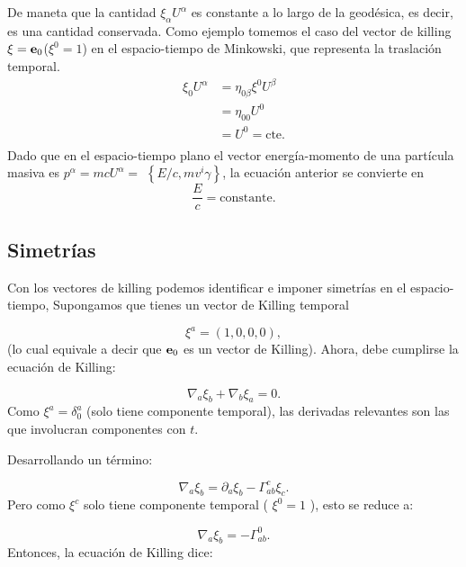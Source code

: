 De maneta que la cantidad $\xi_\alpha U^\alpha$ es constante a lo largo de la geodésica, es decir, es una cantidad conservada.
Como ejemplo tomemos el caso del vector de killing $\mathbf{\xi} = \mathbf{e}_0$($\xi^0 =1$) en el espacio-tiempo de Minkowski, que representa la traslación temporal. 
\begin{equation}
    \begin{aligned}
        \xi_0 U^\alpha & = \eta_{0 \beta} \xi^0 U^\beta \\
        & = \eta_{0 0 } U^0 \\
        & = U^0 = \text{cte.} \\
    \end{aligned}
\end{equation} 
Dado que en el espacio-tiempo plano el vector energía-momento de una partícula masiva es $p^\alpha=m c U^\alpha=$ $\left\{E / c, m v^i \gamma\right\}$, la ecuación anterior se convierte en
\[
    \frac{E}{c}=\text{constante}.
\]


\subsection{Simetrías }
\label{subsec:simetria}
Con los  vectores de killing podemos identificar e imponer simetrías en el espacio-tiempo,
Supongamos que tienes un vector de Killing temporal

\begin{equation}
    \xi^a=(1,0,0,0),   
\end{equation}
(lo cual equivale a decir que $\mathbf{e}_0$ es un vector de Killing).
Ahora, debe cumplirse la ecuación de Killing:

\begin{equation}
    \nabla_a \xi_b+\nabla_b \xi_a=0.
\end{equation}
Como $\xi^a=\delta_0^a$ (solo tiene componente temporal), las derivadas relevantes son las que involucran componentes con $t$.

Desarrollando un término:

\begin{equation}
    \nabla_a \xi_b=\partial_a \xi_b-\Gamma_{a b}^c \xi_c.
\end{equation}
Pero como $\xi^c$ solo tiene componente temporal ( $\xi^0=1$ ), esto se reduce a:

\begin{equation}
    \nabla_a \xi_b=-\Gamma_{a b}^0   . 
\end{equation}
Entonces, la ecuación de Killing dice:

